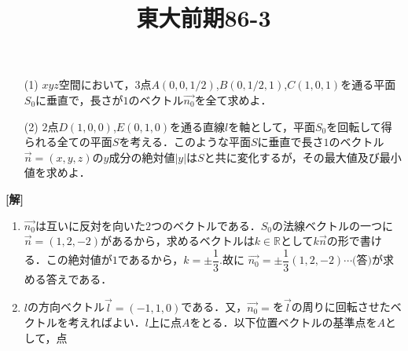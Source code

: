 \documentclass[a4j]{jarticle}
\title{東大前期86-3}
\begin{document}

\begin{oframed}
\begin{itemize}
\item[(1)]$xyz$空間において，$3$点$A(0,0,1/2)$,$B(0,1/2,1)$,$C(1,0,1)$を通る平面$S_0$に垂直で，長さが$1$のベクトル$\vec{n_0}$を全て求めよ．
\item[(2)]$2$点$D(1,0,0)$,$E(0,1,0)$を通る直線$l$を軸として，平面$S_0$を回転して得られる全ての平面$S$を考える．このような平面$S$に垂直で長さ$1$のベクトル$\vec{n}=(x,y,z)$の$y$成分の絶対値$|y|$は$S$と共に変化するが，その最大値及び最小値を求めよ．
\end{itemize}
\end{oframed}
\setlength{\columnseprule}{0.4pt}
\begin{multicols}{2}

{\bf[解]}
\begin{enumerate}[(1)]
\item$\vec{n_0}$は互いに反対を向いた$2$つのベクトルである．$S_0$の法線ベクトルの一つに
$\vec{n}=(1,2,-2)$があるから，求めるベクトルは$k\in\mathbb{R}$として$k\vec{n}$の形で書ける．この絶対値が$1$であるから，$k=\pm\dfrac{1}{3}$.故に
$\vec{n_0}=\pm\dfrac{1}{3}(1,2,-2)\cdots\text{(答)}$が求める答えである．

\item$l$の方向ベクトル$\vec{l}=(-1,1,0)$である．又，$\vec{n_0}=$を$\vec{l}$の周りに回転させたベクトルを考えればよい．$l$上に点$A$をとる．以下位置ベクトルの基準点を$A$として，点
\end{enumerate}
\newpage
\end{multicols}
\end{document}
